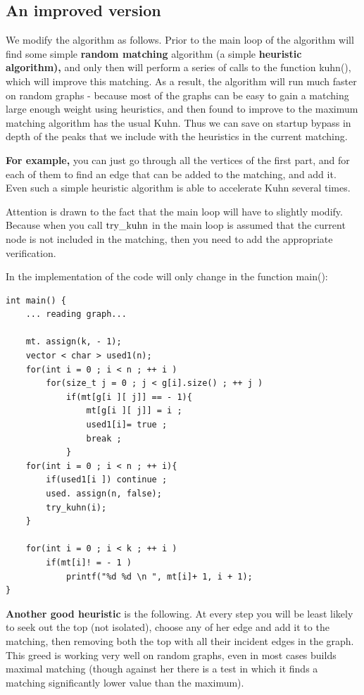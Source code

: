\subsection{ An improved version }

We modify the algorithm as follows. Prior to the main loop of the algorithm will find some simple \textbf{random matching} algorithm (a simple \textbf{heuristic algorithm),} and only then will perform a series of calls to the function kuhn(), which will improve this matching. As a result, the algorithm will run much faster on random graphs - because most of the graphs can be easy to gain a matching large enough weight using heuristics, and then found to improve to the maximum matching algorithm has the usual Kuhn. Thus we can save on startup bypass in depth of the peaks that we include with the heuristics in the current matching.

\textbf{For example,} you can just go through all the vertices of the first part, and for each of them to find an edge that can be added to the matching, and add it. Even such a simple heuristic algorithm is able to accelerate Kuhn several times.

Attention is drawn to the fact that the main loop will have to slightly modify. Because when you call $\rm try \_kuhn$ in the main loop is assumed that the current node is not included in the matching, then you need to add the appropriate verification.

In the implementation of the code will only change in the function main():

\begin{verbatim}
int main() {
    ... reading graph...
 
    mt. assign(k, - 1);
    vector < char > used1(n);
    for(int i = 0 ; i < n ; ++ i )
        for(size_t j = 0 ; j < g[i].size() ; ++ j )
            if(mt[g[i ][ j]] == - 1){
                mt[g[i ][ j]] = i ;
                used1[i]= true ;
                break ;
            }
    for(int i = 0 ; i < n ; ++ i){
        if(used1[i ]) continue ;
        used. assign(n, false);
        try_kuhn(i);
    }
 
    for(int i = 0 ; i < k ; ++ i )
        if(mt[i]! = - 1 )
            printf("%d %d \n ", mt[i]+ 1, i + 1);
} 
\end{verbatim}
\textbf{Another good heuristic} is the following. At every step you will be least likely to seek out the top (not isolated), choose any of her edge and add it to the matching, then removing both the top with all their incident edges in the graph. This greed is working very well on random graphs, even in most cases builds maximal matching (though against her there is a test in which it finds a matching significantly lower value than the maximum).

